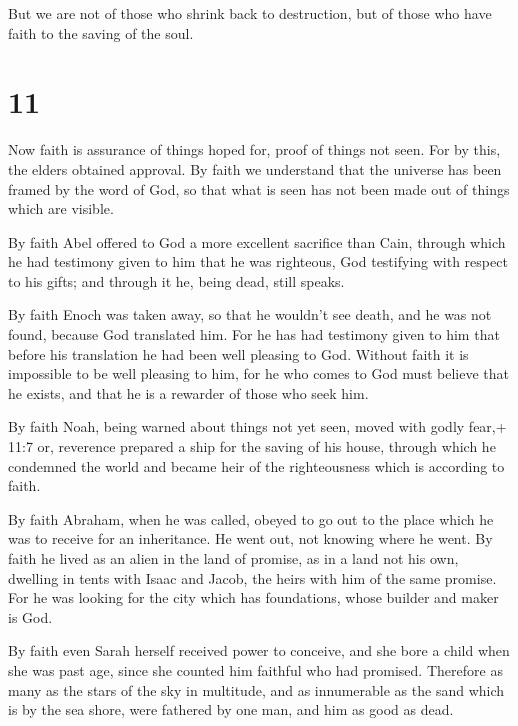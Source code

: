  But we are not of those who shrink back to destruction,
but of those who have faith to the saving of the soul.

\hypertarget{section-10}{%
\section{11}\label{section-10}}

 Now faith is assurance of things hoped for, proof of things
not seen.  For by this, the elders obtained approval.
 By faith we understand that the universe has been framed by
the word of God, so that what is seen has not been made out of things
which are visible.

 By faith Abel offered to God a more excellent sacrifice
than Cain, through which he had testimony given to him that he was
righteous, God testifying with respect to his gifts; and through it he,
being dead, still speaks.

 By faith Enoch was taken away, so that he wouldn't see
death, and he was not found, because God translated him. For he has had
testimony given to him that before his translation he had been well
pleasing to God.  Without faith it is impossible to be well
pleasing to him, for he who comes to God must believe that he exists,
and that he is a rewarder of those who seek him.

 By faith Noah, being warned about things not yet seen,
moved with godly fear,+ 11:7 or, reverence prepared a ship for the
saving of his house, through which he condemned the world and became
heir of the righteousness which is according to faith.

 By faith Abraham, when he was called, obeyed to go out to
the place which he was to receive for an inheritance. He went out, not
knowing where he went.  By faith he lived as an alien in the
land of promise, as in a land not his own, dwelling in tents with Isaac
and Jacob, the heirs with him of the same promise.  For he
was looking for the city which has foundations, whose builder and maker
is God.

 By faith even Sarah herself received power to conceive,
and she bore a child when she was past age, since she counted him
faithful who had promised.  Therefore as many as the stars
of the sky in multitude, and as innumerable as the sand which is by the
sea shore, were fathered by one man, and him as good as dead.

